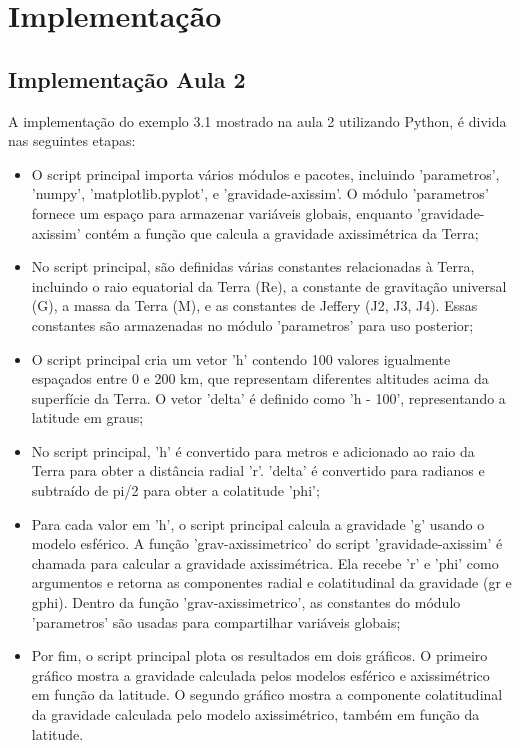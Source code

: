 \chapter{Implementação}

\section{Implementação Aula 2}

A implementação do exemplo 3.1 mostrado na aula 2 utilizando Python, é divida nas seguintes etapas:

\begin{itemize}
    \item O script principal importa vários módulos e pacotes, incluindo 'parametros', 'numpy', 'matplotlib.pyplot', e 'gravidade-axissim'. O módulo 'parametros' fornece um espaço para armazenar variáveis globais, enquanto 'gravidade-axissim' contém a função que calcula a gravidade axissimétrica da Terra;
    \item No script principal, são definidas várias constantes relacionadas à Terra, incluindo o raio equatorial da Terra (Re), a constante de gravitação universal (G), a massa da Terra (M), e as constantes de Jeffery (J2, J3, J4). Essas constantes são armazenadas no módulo 'parametros' para uso posterior;
    \item O script principal cria um vetor 'h' contendo 100 valores igualmente espaçados entre 0 e 200 km, que representam diferentes altitudes acima da superfície da Terra. O vetor 'delta' é definido como 'h - 100', representando a latitude em graus;
    
    \item No script principal, 'h' é convertido para metros e adicionado ao raio da Terra para obter a distância radial 'r'. 'delta' é convertido para radianos e subtraído de pi/2 para obter a colatitude 'phi';
    
    \item Para cada valor em 'h', o script principal calcula a gravidade 'g' usando o modelo esférico. A função 'grav-axissimetrico' do script 'gravidade-axissim' é chamada para calcular a gravidade axissimétrica. Ela recebe 'r' e 'phi' como argumentos e retorna as componentes radial e colatitudinal da gravidade (gr e gphi). Dentro da função 'grav-axissimetrico', as constantes do módulo 'parametros' são usadas para compartilhar variáveis globais; 
    
    \item Por fim, o script principal plota os resultados em dois gráficos. O primeiro gráfico mostra a gravidade calculada pelos modelos esférico e axissimétrico em função da latitude. O segundo gráfico mostra a componente colatitudinal da gravidade calculada pelo modelo axissimétrico, também em função da latitude.
\end{itemize}

